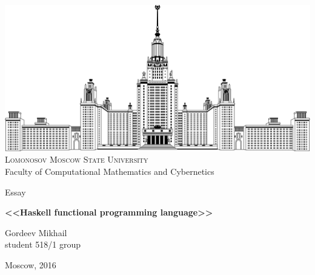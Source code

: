 \documentclass [12pt, a4paper] {article}
\begin{document}
\thispagestyle {empty}

\begin {center}
\ \vspace{-4cm}

\includegraphics [width = 0.5 \textwidth] {msu.png} \\
{\scshape Lomonosov Moscow State University} \\
Faculty of Computational Mathematics and Cybernetics \\

\vspace {5cm}

{\LARGE Essay}

\vspace {1cm}

{\Huge \bfseries
<<Haskell functional programming language>> \\}
\end {center}

\vfill
\vfill

\begin {flushright}
  \large
  Gordeev Mikhail \\
  student 518/1 group \\

  \vspace {5mm}
\end {flushright}

\vfill

\begin {center}
Moscow, 2016
\end {center}

\enlargethispage {4 \baselineskip}

\newpage
\end{document}
